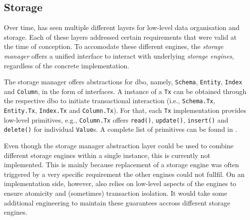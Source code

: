 \subsection{Storage}
Over time, \cottontail{} has seen multiple different layers for low-level data organisation and storage. Each of these layers addressed certain requirements that were valid at the time of conception. To accomodate these different engines, the \emph{storage manager} offers a unified interface to interact with underlying \emph{storage engines}, regardless of the concrete implementation. 

The storage manager offers abstractions for \acrfull{dbo}, namely, \texttt{Schema}, \texttt{Entity}, \texttt{Index} and \texttt{Column}, in the form of interfaces. A instance of a \texttt{Tx} can be obtained through the respective \acrshort{dbo} to initiate transactional interaction (i.e., \texttt{Schema.Tx}, \texttt{Entity.Tx}, \texttt{Index.Tx} and \texttt{Column.Tx}). For that, each \texttt{Tx} implementation provides low-level primitives, e.g., \texttt{Column.Tx} offers \texttt{read()}, \texttt{update()}, \texttt{insert()} and \texttt{delete()} for individual \texttt{Value}s. A complete list of primitives can be found in .

Even though the storage manager abstraction layer could be used to combine different storage engines within a single instance, this is currently not implemented. This is mainly because replacement of a storage engine was often triggered by a very specific requirement the other engines could not fullfil. On an implementation side, however, \cottontail{} also relies on low-level aspects of the engines to ensure atomicity and (sometimes) transaction isolation. It would take some additional engineering to maintain these guarantees accross different storage engines.


